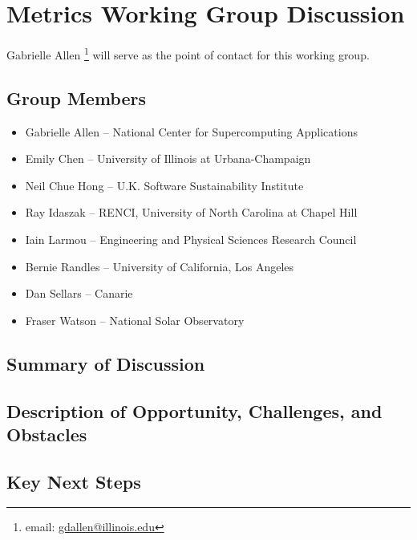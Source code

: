 \section{Metrics Working Group Discussion}
\label{sec:appendix_metrics}
 
Gabrielle Allen \footnote{email: \href{mailto:gdallen@illinois.edu}{gdallen@illinois.edu}} will serve as the point of contact for this working group.


\subsection{Group Members}

\begin{itemize}
\item Gabrielle Allen -- National Center for Supercomputing Applications
\item Emily Chen -- University of Illinois at Urbana-Champaign
\item Neil Chue Hong -- U.K. Software Sustainability Institute
\item Ray Idaszak -- RENCI, University of North Carolina at Chapel Hill
\item Iain Larmou -- Engineering and Physical Sciences Research Council
\item Bernie Randles -- University of California, Los Angeles
\item Dan Sellars -- Canarie
\item Fraser Watson -- National Solar Observatory
\end{itemize}

\subsection{Summary of Discussion}





\subsection{Description of Opportunity, Challenges, and Obstacles}






\subsection{Key Next Steps}






